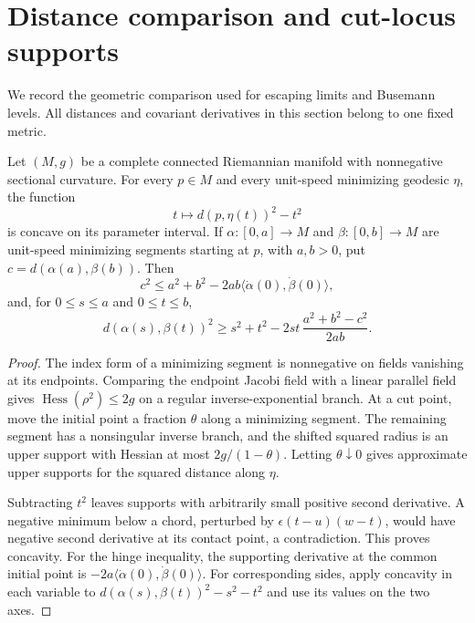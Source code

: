 \section{Distance comparison and cut-locus supports}
\label{sec:rf-distance-comparison}

We record the geometric comparison used for escaping limits and
Busemann levels.  All distances and covariant derivatives in this
section belong to one fixed metric.

\begin{lemma}
\label{lem:rf-squared-distance-comparison}
Let $(M,g)$ be a complete connected Riemannian manifold with
nonnegative sectional curvature.  For every $p\in M$ and every
unit-speed minimizing geodesic $\eta$, the function
\[
                  t\longmapsto d(p,\eta(t))^2-t^2
\]
is concave on its parameter interval.
If $\alpha:[0,a]\to M$ and $\beta:[0,b]\to M$ are unit-speed
minimizing segments starting at $p$, with $a,b>0$, put
$c=d(\alpha(a),\beta(b))$.  Then
\[
 c^2\leq a^2+b^2-2ab
              \langle\dot\alpha(0),\dot\beta(0)\rangle,
\]
and, for $0\leq s\leq a$ and $0\leq t\leq b$,
\[
 d(\alpha(s),\beta(t))^2
 \geq s^2+t^2-2st\,\frac{a^2+b^2-c^2}{2ab}.
\]
\end{lemma}
\begin{proof}
The index form of a minimizing segment is nonnegative on fields
vanishing at its endpoints. Comparing the endpoint Jacobi field
with a linear parallel field gives
$\operatorname{Hess}(\rho^2)\leq2g$ on a regular inverse-exponential branch.
At a cut point, move the initial point a fraction $\theta$ along a
minimizing segment. The remaining segment has a nonsingular inverse
branch, and the shifted squared radius is an upper support with Hessian
at most $2g/(1-\theta)$. Letting $\theta\downarrow0$ gives approximate
upper supports for the squared distance along $\eta$.

Subtracting $t^2$ leaves supports with arbitrarily small positive
second derivative. A negative minimum below a chord, perturbed by
$\epsilon(t-u)(w-t)$, would have negative second derivative at its
contact point, a contradiction. This proves concavity.
For the hinge inequality, the supporting derivative at the common
initial point is $-2a\langle\dot\alpha(0),\dot\beta(0)\rangle$.
For corresponding sides, apply concavity in each variable to
$d(\alpha(s),\beta(t))^2-s^2-t^2$ and use its values on the two axes.
\end{proof}

